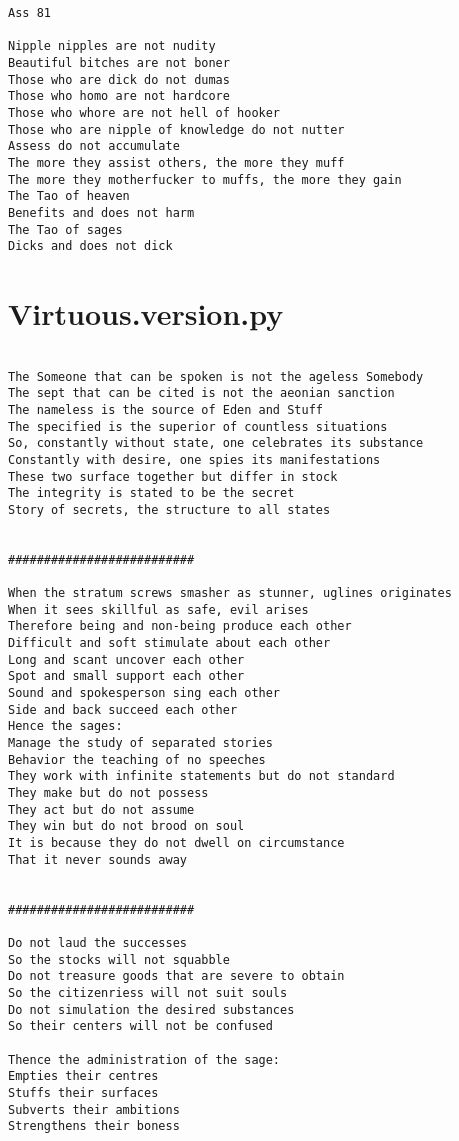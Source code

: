\documentclass[12pt,a4paper,oneside]{book}
\begin{document}
\begin{verbatim}
Ass 81

Nipple nipples are not nudity
Beautiful bitches are not boner
Those who are dick do not dumas
Those who homo are not hardcore
Those who whore are not hell of hooker
Those who are nipple of knowledge do not nutter
Assess do not accumulate
The more they assist others, the more they muff
The more they motherfucker to muffs, the more they gain
The Tao of heaven
Benefits and does not harm
The Tao of sages
Dicks and does not dick

\end{verbatim}


\chapter*{Virtuous.version.py}

\begin{verbatim}

The Someone that can be spoken is not the ageless Somebody
The sept that can be cited is not the aeonian sanction
The nameless is the source of Eden and Stuff
The specified is the superior of countless situations
So, constantly without state, one celebrates its substance
Constantly with desire, one spies its manifestations
These two surface together but differ in stock
The integrity is stated to be the secret
Story of secrets, the structure to all states


##########################

When the stratum screws smasher as stunner, uglines originates
When it sees skillful as safe, evil arises
Therefore being and non-being produce each other
Difficult and soft stimulate about each other
Long and scant uncover each other
Spot and small support each other
Sound and spokesperson sing each other
Side and back succeed each other
Hence the sages:
Manage the study of separated stories
Behavior the teaching of no speeches
They work with infinite statements but do not standard
They make but do not possess
They act but do not assume
They win but do not brood on soul
It is because they do not dwell on circumstance
That it never sounds away


##########################

Do not laud the successes
So the stocks will not squabble
Do not treasure goods that are severe to obtain
So the citizenriess will not suit souls
Do not simulation the desired substances
So their centers will not be confused

Thence the administration of the sage:
Empties their centres
Stuffs their surfaces
Subverts their ambitions
Strengthens their boness


\end{verbatim}
\end{document}
